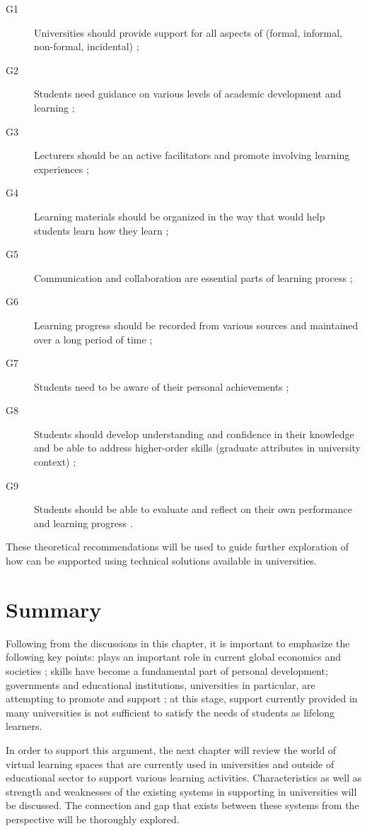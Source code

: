 \begin{description}
  \item[G1] Universities should provide support for all aspects of \LLLs
  (formal, informal, non-formal, incidental) \citep{Attwell2007, Smidt2011};
  \item[G2] Students need guidance on various levels of academic development and
  learning \citep{Leone2019};
  \item[G3] Lecturers should be an active facilitators and promote involving
  learning experiences \citep{Leone2019}; 
  \item[G4] Learning materials should be organized in the way that would help
students learn how they learn \citep{Medel-Anonuevo2001};
  \item[G5] Communication and collaboration are essential parts of learning
  process \citep{Schaffert2008};
  \item[G6] Learning progress should be recorded from various sources and
  maintained over a long period of time \citep{Kay2008};
  \item[G7] Students need to be aware of their personal achievements
\citep{Schuetze2006};
  \item[G8] Students should develop understanding and confidence in their
  knowledge and be able to address higher-order skills (graduate attributes in university
  context) \citep{Hart1999};
  \item[G9] Students should be able to evaluate and reflect on their own
  performance and learning progress \citep{Mourtos2003}.
\end{description} 

These theoretical recommendations will be used to guide further exploration of
 how \LLLs can be supported using technical solutions available in universities.

\section{Summary} 

Following from the discussions in this chapter, it is important to emphasize
the following key points: \LLLs plays an important role in current global
economics and societies
\citep{Jarvis2008,Simmons-McDonald2009,InternationalLabourOffice2008}; \LLLs
skills have become a fundamental part of personal development; governments and
educational institutions, universities in particular, are attempting to promote
and support \LLLsn; at this stage, \LLLs support currently provided in many
universities is not sufficient to satisfy the needs of students as lifelong
learners.

In order to support this argument, the next chapter will review the world of
virtual learning spaces that are currently used in universities and outside of
educational sector to support various learning activities. Characteristics as
well as strength and weaknesses of the existing systems in supporting \LLLs
in universities will be discussed. The connection and gap that exists between
these systems from the \LLLs perspective will be thoroughly explored.
